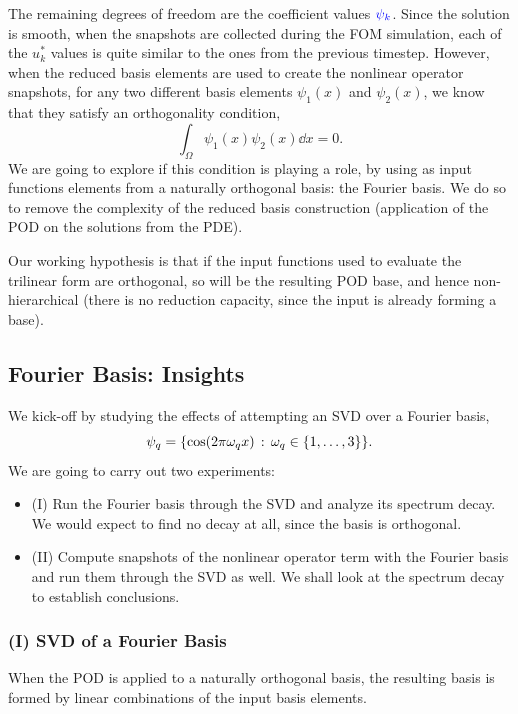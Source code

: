 \documentclass[../../thesis.tex]{subfiles}
\begin{document}
The remaining degrees of freedom are the coefficient values 
$\textcolor{blue}{\psi_k}$.
Since the solution is smooth,
when the snapshots are collected during the FOM simulation, 
each of the $u_k^{*}$ values is quite similar to the ones from the previous timestep.
However, when the reduced basis elements are used to create 
the nonlinear operator snapshots, 
for any two different basis elements $\psi_1(x)$ and $\psi_2(x)$,
we know that they satisfy an orthogonality condition,
\begin{equation}
    \int_\Omega \psi_1(x) \psi_2(x) \dd x = 0.
\end{equation}
We are going to explore if this condition is playing a role, 
by using as input functions elements from a naturally orthogonal basis:
the Fourier basis.
We do so to remove the complexity of the reduced basis construction 
(application of the POD on the solutions from the PDE). 

Our working hypothesis is that if the input functions used to evaluate the 
trilinear form are orthogonal, so will be the resulting POD base,
and hence non-hierarchical 
(there is no reduction capacity, since the input is already forming a base).

\subsection{Fourier Basis: Insights}
We kick-off by studying the effects of attempting an SVD over a Fourier basis, 
\begin{equation}
    \psi_q = \qty{\cos(2 \pi \omega_q x) \, : \, \omega_q \in \qty{1, \ldots, 3}}.
\end{equation}
We are going to carry out two experiments:
\begin{itemize}
    \item (I) Run the Fourier basis through the SVD and analyze its spectrum decay. 
    We would expect to find no decay at all, since the basis is orthogonal.
    \item (II) Compute snapshots of the nonlinear operator term with the Fourier basis
    and run them through the SVD as well.
    We shall look at the spectrum decay to establish conclusions. 
\end{itemize}

\subsubsection{(I) SVD of a Fourier Basis}
When the POD is applied to a naturally orthogonal basis, 
the resulting basis is formed by linear combinations of the input basis elements.
\end{document}
